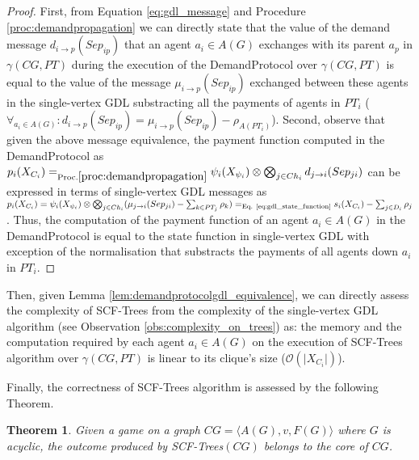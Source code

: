 \documentclass{aamas2012}
\newtheorem{theorem}{Theorem}
\begin{document}
\begin{proof}
First, from Equation \ref{eq:gdl_message} and Procedure
\ref{proc:demandpropagation} we can directly state that the value of the demand message $d_{i \rightarrow
p}(Sep_{ip})$ that an agent $a_i\in A(G)$ exchanges with its parent $a_p$ in
$\gamma(CG,PT)$ during the execution of the DemandProtocol over $\gamma(CG,PT)$
is equal to the value of the message $\mu_{i \rightarrow
p}(Sep_{ip})$ exchanged between these agents in the single-vertex GDL
substracting all the payments of agents in $PT_i$ ($\forall_{a_i\in A(G)}: d_{i
\rightarrow p}(Sep_{ip})= \mu_{i \rightarrow p}(Sep_{ip}) - \rho_{A(PT_i)}$).
Second, observe that given the above message equivalence, the payment function
computed in the DemandProtocol as $p_i(X_{C_i}) =_{\textrm{Proc.}
\ref{proc:demandpropagation} } \psi_i(X_{\psi_i}) \otimes  \bigotimes_{j \in Ch_i} d_{j \rightarrow
i}(Sep_{ji})$ can be expressed in terms of single-vertex GDL messages as
$p_i(X_{C_i})= \allowbreak \psi_i(X_{\psi_i}) \otimes \bigotimes_{j \in Ch_i} ( \mu_{j \rightarrow
 i}(Sep_{ji}) - \sum_{k\in PT_j} \rho_k) =_{\text{Eq.
 \ref{eq:gdl_state_function}}}\allowbreak s_i(X_{C_i}) - \sum_{j\in D_i}\rho_{j}$.
 Thus, the computation of the payment function of an agent $a_i\in A(G)$ in the
 DemandProtocol is equal to the state function in single-vertex GDL
 with exception of the normalisation that substracts the payments of
 all agents down $a_i$ in $PT_i$.
\end{proof}

\noindent Then, given Lemma \ref{lem:demandprotocolgdl_equivalence}, we can
directly assess the complexity of SCF-Trees from the complexity of the
single-vertex GDL algorithm (see Observation \ref{obs:complexity_on_trees}) as:
the memory and the computation required by each agent $a_i\in A(G)$ on the execution of SCF-Trees algorithm over $\gamma(CG,PT)$ is linear to its clique's size ($\mathcal{O}(\vert X_{C_i}\vert)$).

 
\noindent Finally, the correctness of SCF-Trees algorithm is assessed by the
following Theorem.

\begin{theorem}
Given a game on a graph $CG = \langle A(G), v, F(G)\rangle $ where $G$ is
acyclic, the outcome produced by SCF-Trees$(CG)$ belongs to the core of $CG$.
\label{th:StableCoalitionFormationOnTrees_correctness}
\end{theorem}
\end{document}
